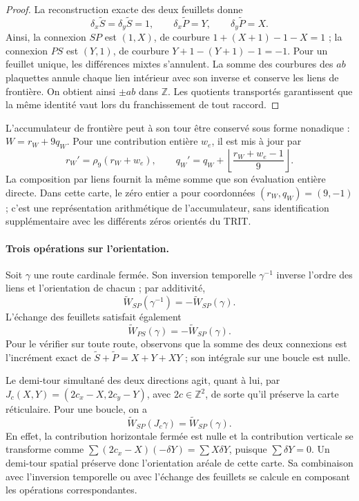 \begin{proof}
La reconstruction exacte des deux feuillets donne
\[
 \delta_x\widetilde S=\delta_y\widetilde S=1,
 \qquad\delta_x\widetilde P=Y,
 \qquad\delta_y\widetilde P=X.
\]
Ainsi, la connexion $SP$ est $(1,X)$, de courbure
$1+(X+1)-1-X=1$ ; la connexion $PS$ est $(Y,1)$, de courbure
$Y+1-(Y+1)-1=-1$. Pour un feuillet unique, les différences
mixtes s'annulent. La somme des courbures des $ab$ plaquettes annule chaque
lien intérieur avec son inverse et conserve les liens de frontière.
On obtient ainsi $\pm ab$ dans $\mathbb Z$. Les quotients transportés
garantissent que la même identité vaut lors du franchissement de tout raccord.
\end{proof}

L'accumulateur de frontière peut à son tour être conservé sous forme nonadique :
$W=r_W+9q_W$. Pour une contribution entière $w_e$, il est mis à jour par
\[
 r_W'=\rho_9(r_W+w_e),\qquad
 q_W'=q_W+\left\lfloor\frac{r_W+w_e-1}{9}\right\rfloor.
\]
La composition par liens fournit la même somme que son évaluation
entière directe. Dans cette carte, le zéro entier a pour coordonnées
$(r_W,q_W)=(9,-1)$ ; c'est une représentation arithmétique de l'accumulateur,
sans identification supplémentaire avec les différents zéros orientés du TRIT.

\paragraph{Trois opérations sur l'orientation.}
Soit $\gamma$ une route cardinale fermée. Son inversion temporelle
$\gamma^{-1}$ inverse l'ordre des liens et l'orientation de chacun ;
par additivité,
\[
 \widetilde W_{SP}(\gamma^{-1})=-\widetilde W_{SP}(\gamma).
\]
L'échange des feuillets satisfait également
\[
 \widetilde W_{PS}(\gamma)=-\widetilde W_{SP}(\gamma).
\]
Pour le vérifier sur toute route, observons que la somme des deux
connexions est l'incrément exact de
$\widetilde S+\widetilde P=X+Y+XY$ ; son intégrale sur une boucle est nulle.

Le demi-tour simultané des deux directions agit, quant à lui,
par $J_c(X,Y)=(2c_x-X,2c_y-Y)$, avec $2c\in\mathbb Z^2$,
de sorte qu'il préserve la carte réticulaire. Pour une boucle, on a
\[
 \widetilde W_{SP}(J_c\gamma)=\widetilde W_{SP}(\gamma).
\]
En effet, la contribution horizontale fermée est nulle et la contribution verticale
se transforme comme
$\sum (2c_x-X)(-\delta Y)=\sum X\delta Y$, puisque
$\sum\delta Y=0$. Un demi-tour spatial préserve donc
l'orientation aréale de cette carte. Sa combinaison avec l'inversion temporelle
ou avec l'échange des feuillets se calcule en composant les opérations
correspondantes.

